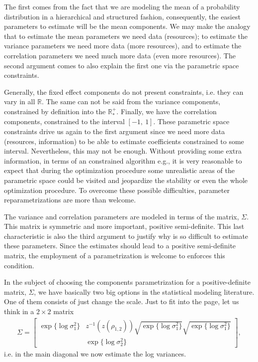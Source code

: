 The first comes from the fact that we are modeling the mean of a
probability distribution in a hierarchical and structured fashion,
consequently, the easiest parameters to estimate will be the mean
components. We may make the analogy that to estimate the mean parameters
we need data (resources); to estimate the variance parameters we need
more data (more resources), and to estimate the correlation parameters
we need much more data (even more resources). The second argument comes
to also explain the first one via the parametric space constraints.

Generally, the fixed effect components do not present constraints, i.e.
they can vary in all \(\mathbb{R}\). The same can not be said from the
variance components, constrained by definition into the
\(\mathbb{R}_{\ast}^{+}\). Finally, we have the correlation components,
constrained to the interval \([-1,~1]\). These parametric space
constraints drive us again to the first argument since we need more data
(resources, information) to be able to estimate coefficients constrained
to some interval. Nevertheless, this may not be enough. Without
providing some extra information, in terms of an constrained algorithm
e.g., it is very reasonable to expect that during the optimization
procedure some unrealistic areas of the parametric space could be
visited and jeopardize the stability or even the whole optimization
procedure. To overcome these possible difficulties, parameter
reparametrizations are more than welcome.

The variance and correlation parameters are modeled in terms of the
matrix, \(\Sigma\). This matrix is symmetric and more important,
positive semi-definite. This last characteristic is also the third
argument to justify why is so difficult to estimate these
parameters. Since the estimates should lead to a positive semi-definite
matrix, the employment of a parametrization is welcome to enforces this
condition.

In the subject of choosing the components parametrization for a
positive-definite matrix, \(\Sigma\), we have basically two big options
in the statistical modeling literature. One of them consists of just
change the scale. Just to fit into the page, let us think in a
\(2\times 2\) matrix
\begin{align*}
 \Sigma = \begin{bmatrix}
           \exp\{\log\sigma_{1}^{2}\}&
           z^{-1}(z(\rho_{1,2}))
           \sqrt{\exp\{\log\sigma_{1}^{2}\}}
           \sqrt{\exp\{\log\sigma_{1}^{2}\}}\\
           &\exp\{\log\sigma_{2}^{2}\}
          \end{bmatrix},
\end{align*}
i.e. in the main diagonal we now estimate the log variances.

